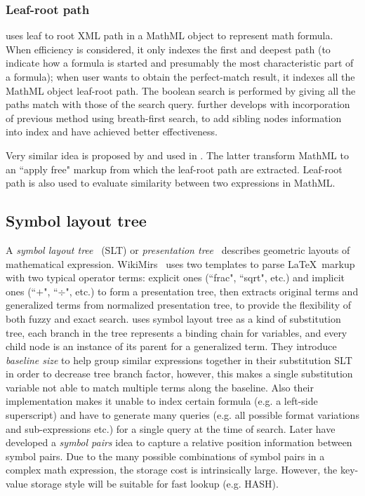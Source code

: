 \subsubsection*{Leaf-root path}
\label{leafrootmethod}
\cite{MathMLleafroot} uses leaf to root XML path in a MathML object to represent math formula. When efficiency is considered, it only indexes the first and deepest path (to indicate how a formula is started and presumably the most characteristic part of a formula); 
when user wants to obtain the perfect-match result, it indexes all the MathML object leaf-root path. The boolean search is performed by giving all the paths match with those of the search query. 
\cite{sefobyfo} further develops with incorporation of previous method using breath-first search, to add sibling nodes information into index and have achieved better effectiveness.

Very similar idea is proposed by \cite{signifjap} and used in \cite{signfused}. The latter transform MathML to an ``apply free" markup from which the leaf-root path are extracted. Leaf-root path is also used to evaluate similarity between two expressions in MathML.

\subsection*{Symbol layout tree}
A \textit{symbol layout tree}~\cite{symbollayout12} (SLT) or \textit{presentation tree}~\cite{WikiMirs13} describes geometric layouts of mathematical expression. 
WikiMirs~\cite{WikiMirs13} uses two templates to parse \LaTeX\  markup with two typical operator terms: explicit ones (``\bbb frac", ``\bbb sqrt", etc.) and implicit ones (``$+$", ``$\div$", etc.) to form a presentation tree, then extracts original terms and generalized terms from normalized presentation tree, to provide the flexibility of both fuzzy and exact search. 
\cite{symbollayout12} uses symbol layout tree as a kind of substitution tree, each branch in the tree represents a binding chain for variables, and every child node is an instance of its parent for a generalized term. 
They introduce \textit{baseline size} to help group similar expressions together in their substitution SLT in order to decrease tree branch factor, however, this makes a single substitution variable not able to match multiple terms along the baseline. 
Also their implementation makes it unable to index certain formula (e.g. a left-side superscript) and have to generate many queries (e.g. all possible format variations and sub-expressions etc.) for a single query at the time of search.
Later \cite{symbolpairs15,symbolpair15:2} have developed a \textit{symbol pairs} idea to capture a relative position information between symbol pairs. Due to the many possible combinations of symbol pairs in a complex math expression, the storage cost is intrinsically large. However, the key-value storage style will be suitable for fast lookup (e.g. HASH). 

